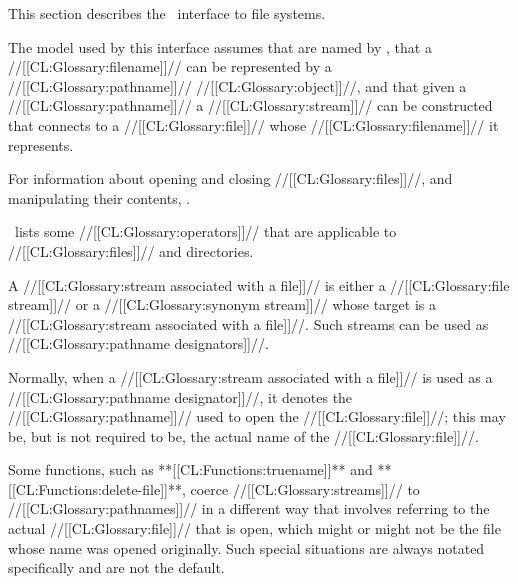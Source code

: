 

This section describes the \clisp\ interface to file systems.

The model used by this interface assumes 
     that  are named by ,
     that a //[[CL:Glossary:filename]]// can be represented by a //[[CL:Glossary:pathname]]// //[[CL:Glossary:object]]//, 
 and that given a //[[CL:Glossary:pathname]]// a //[[CL:Glossary:stream]]// can be constructed 
      that connects to a //[[CL:Glossary:file]]// whose //[[CL:Glossary:filename]]// it represents.

For information about opening and closing //[[CL:Glossary:files]]//, and manipulating their contents, \seechapter\Streams.

\Thenextfigure\ lists some //[[CL:Glossary:operators]]//  that are applicable to //[[CL:Glossary:files]]// and directories.


 

A //[[CL:Glossary:stream associated with a file]]// is either a //[[CL:Glossary:file stream]]// or a //[[CL:Glossary:synonym stream]]// whose target is a //[[CL:Glossary:stream associated with a file]]//. Such streams can be used as //[[CL:Glossary:pathname designators]]//.

Normally, when a //[[CL:Glossary:stream associated with a file]]// is used as a //[[CL:Glossary:pathname designator]]//, it denotes the //[[CL:Glossary:pathname]]// used to  open the //[[CL:Glossary:file]]//; this may be, but is not required to be, the actual name of the //[[CL:Glossary:file]]//.

Some functions, such as **[[CL:Functions:truename]]** and **[[CL:Functions:delete-file]]**, coerce //[[CL:Glossary:streams]]// to //[[CL:Glossary:pathnames]]// in a different way that  involves referring to the actual //[[CL:Glossary:file]]// that is open, which might or might not be the file whose name was opened originally.  Such special situations are always notated specifically and are not the default.

\endsubsection%

 

